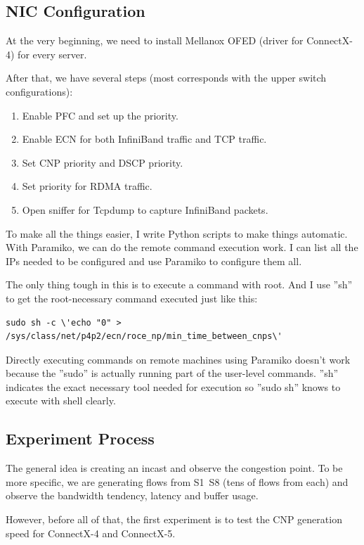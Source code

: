 \documentclass[12pt,a4paper]{article}
\begin{document}
\subsection{NIC Configuration}
At the very beginning, we need to install Mellanox OFED (driver for ConnectX-4) for every server.

After that, we have several steps (most corresponds with the upper switch configurations):
\begin{enumerate}
	\item Enable PFC and set up the priority.
	\item Enable ECN for both InfiniBand traffic and TCP traffic.
	\item Set CNP priority and DSCP priority.
	\item Set priority for RDMA traffic.
	\item Open sniffer for Tcpdump \cite{Tcpdump} to capture InfiniBand packets.
\end{enumerate}

To make all the things easier, I write Python scripts to make things automatic.
With Paramiko, we can do the remote command execution work.
I can list all the IPs needed to be configured and use Paramiko to configure them all.

The only thing tough in this is to execute a command with root.
And I use ''sh'' to get the root-necessary command executed just like this:
\begin{lstlisting}
sudo sh -c \'echo "0" > /sys/class/net/p4p2/ecn/roce_np/min_time_between_cnps\'
\end{lstlisting}

Directly executing commands on remote machines using Paramiko doesn't work because the ''sudo'' is actually running part of
the user-level commands.
''sh'' indicates the exact necessary tool needed for execution so ''sudo sh'' knows to execute with shell clearly.

\subsection{Experiment Process}

The general idea is creating an incast and observe the congestion point.
To be more specific, we are generating flows from S1~S8 (tens of flows from each) and observe the bandwidth tendency, latency and buffer usage.

However, before all of that, the first experiment is to test the CNP generation speed for ConnectX-4 and ConnectX-5. 
\end{document}
